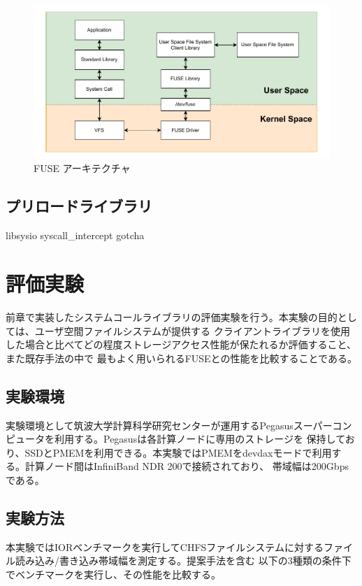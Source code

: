 \documentclass[a4paper,11pt]{jreport}
\begin{document}
\newpage


\begin{figure}[h]
	\begin{minipage}[b]{1\columnwidth}
		\centering
		\includegraphics[width=0.9\linewidth]{./figure/FUSE.pdf}
		\caption{FUSE アーキテクチャ}
		\label{fig:FUSE}
	\end{minipage}
\end{figure}

\newpage


\section{プリロードライブラリ}
libsysio
syscall\_intercept
gotcha

\chapter{評価実験}
前章で実装したシステムコールライブラリの評価実験を行う。本実験の目的としては、ユーザ空間ファイルシステムが提供する
クライアントライブラリを使用した場合と比べてどの程度ストレージアクセス性能が保たれるか評価すること、また既存手法の中で
最もよく用いられるFUSEとの性能を比較することである。

\section{実験環境}
実験環境として筑波大学計算科学研究センターが運用するPegasusスーパーコンピュータを利用する。Pegasusは各計算ノードに専用のストレージを
保持しており、SSDとPMEMを利用できる。本実験ではPMEMをdevdaxモードで利用する。計算ノード間はInfiniBand NDR 200で接続されており、
帯域幅は200Gbpsである。
\section{実験方法}
本実験ではIORベンチマーク\cite{ior}を実行してCHFSファイルシステムに対するファイル読み込み/書き込み帯域幅を測定する。提案手法を含む
以下の3種類の条件下でベンチマークを実行し、その性能を比較する。
\end{document}
